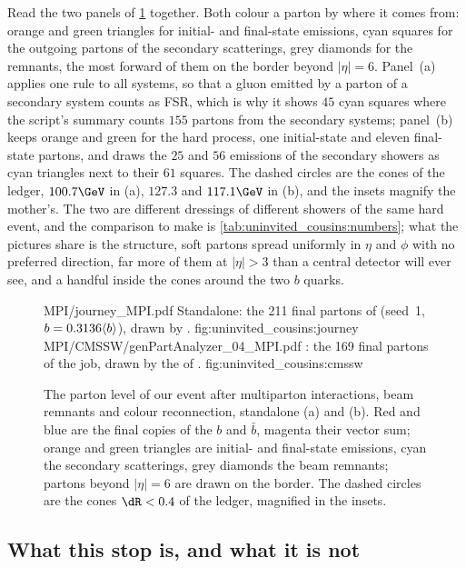 Read the two panels of \cref{fig:uninvited_cousins:displays} together.
Both colour a parton by where it comes from: orange and green triangles
for initial- and final-state emissions, cyan squares for the outgoing
partons of the secondary scatterings, grey diamonds for the remnants, the
most forward of them on the border beyond $|\eta|=6$. Panel~(a) applies one rule to all
systems, so that a gluon emitted by a parton of a secondary system counts
as FSR, which is why it shows $45$ cyan squares where the script's summary
counts $155$ partons from the secondary systems; panel~(b) keeps orange
and green for the hard process, one initial-state and eleven final-state
partons, and draws the $25$ and $56$ emissions of the secondary showers as
cyan triangles next to their $61$ squares. The dashed circles are the
cones of the ledger, $100.7\GeV$ in (a), $127.3$ and $117.1\GeV$ in (b),
and the insets magnify the mother's. The two are different dressings of
different showers of the same hard event, and the comparison to make is
\cref{tab:uninvited_cousins:numbers}; what the pictures share is the
structure, soft partons spread uniformly in $\eta$ and $\phi$ with no
preferred direction, far more of them at $|\eta|>3$ than a central
detector will ever see, and a handful inside the cones around the two $b$
quarks.

\begin{figure}[p]\centering
\ledgerdisplays
  {MPI/journey_MPI.pdf}
  {Standalone: the 211 final partons of  (seed~1, $b=0.3136\langle b\rangle$), drawn by .}
  {fig:uninvited_cousins:journey}
  {MPI/CMSSW/genPartAnalyzer_04_MPI.pdf}
  {\CMSSW: the 169 final partons of the  job, drawn by the  of .}
  {fig:uninvited_cousins:cmssw}
\caption[The event after MPI and beam remnants in the $(\eta,\phi)$ plane,
standalone and \CMSSW]{The parton level of our event after multiparton
interactions, beam remnants and colour reconnection, standalone (a) and
\CMSSW (b). Red and blue are the final copies of the $b$ and $\bar b$,
magenta their vector sum; orange and green triangles are initial- and
final-state emissions, cyan the secondary scatterings, grey diamonds the
beam remnants; partons beyond $|\eta|=6$ are drawn on the border. The
dashed circles are the cones $\dR<0.4$ of the ledger, magnified in the
insets.}
\label{fig:uninvited_cousins:displays}
\end{figure}

\subsection{What this stop is, and what it is not}
\label{sec:uninvited_cousins:caveats}

